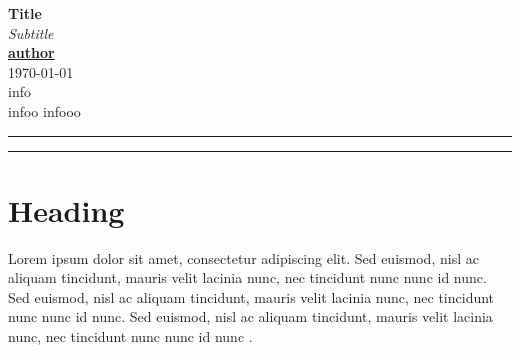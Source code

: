 \documentclass[12pt, a4paper]{article}
\begin{document}
\begin{center}
    {{\Large \textbf{Title}}\\ \textit{Subtitle}}\\
\vspace{0.4cm}
\normalsize
    \underline{\textbf{author}} \\
\vspace{0.1cm}
    \today\\
\medskip
\small{info}\\
\medskip\vspace{0,5cm}
\small{infoo} \hspace*{3cm} \small{infooo}\\
\medskip
    \normalsize
\end{center}
\medskip

{\color{gray}\hrule}

 \tableofcontents

\medskip

{\color{gray}\hrule}
\bigskip
\thispagestyle{empty}

\newpage
\setcounter{page}{1}

\section{Heading}

Lorem ipsum dolor sit amet, consectetur adipiscing elit. Sed euismod, nisl ac aliquam tincidunt, mauris velit lacinia nunc, nec tincidunt nunc nunc id nunc. Sed euismod, nisl ac aliquam tincidunt, mauris velit lacinia nunc, nec tincidunt nunc nunc id nunc. Sed euismod, nisl ac aliquam tincidunt, mauris velit lacinia nunc, nec tincidunt nunc nunc id nunc \parencite{luhmann1984}.


\printbibliography
\end{document}
